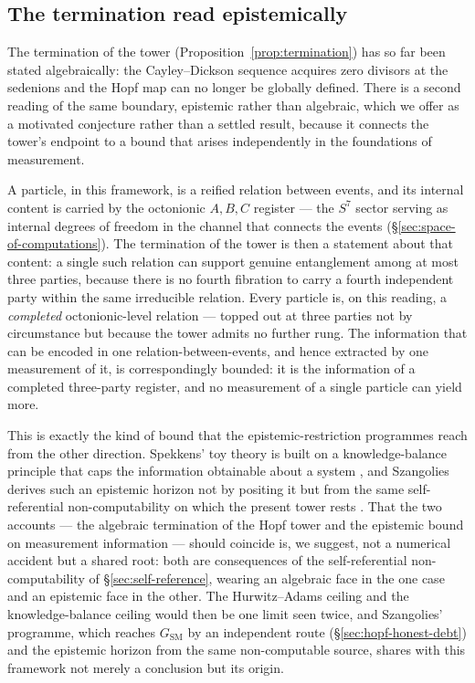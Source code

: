 \subsection{The termination read epistemically}
\label{sec:hopf-information-bound}

The termination of the tower (Proposition~\ref{prop:termination}) has so far been stated
algebraically: the Cayley--Dickson sequence acquires zero divisors at the sedenions and the Hopf
map can no longer be globally defined. There is a second reading of the same boundary, epistemic
rather than algebraic, which we offer as a motivated conjecture rather than a settled result,
because it connects the tower's endpoint to a bound that arises independently in the foundations
of measurement.

A particle, in this framework, is a reified relation between events, and its internal content is
carried by the octonionic $A,B,C$ register --- the $S^{7}$ sector serving as internal degrees of
freedom in the channel that connects the events (\S\ref{sec:space-of-computations}). The
termination of the tower is then a statement about that content: a single such relation can
support genuine entanglement among at most three parties, because there is no fourth fibration
to carry a fourth independent party within the same irreducible relation. Every particle is, on
this reading, a \emph{completed} octonionic-level relation --- topped out at three parties not
by circumstance but because the tower admits no further rung. The information that can be
encoded in one relation-between-events, and hence extracted by one measurement of it, is
correspondingly bounded: it is the information of a completed three-party register, and no
measurement of a single particle can yield more.

This is exactly the kind of bound that the epistemic-restriction programmes reach from the other
direction. Spekkens' toy theory is built on a knowledge-balance principle that caps the
information obtainable about a system \autocite{spekkens2007toy}, and Szangolies derives such an
epistemic horizon not by positing it but from the same self-referential non-computability on
which the present tower rests \autocite{szangolies_j_2018}. That the two accounts --- the
algebraic termination of the Hopf tower and the epistemic bound on measurement information ---
should coincide is, we suggest, not a numerical accident but a shared root: both are
consequences of the self-referential non-computability of \S\ref{sec:self-reference}, wearing an
algebraic face in the one case and an epistemic face in the other. The Hurwitz--Adams ceiling
and the knowledge-balance ceiling would then be one limit seen twice, and Szangolies' programme,
which reaches $G_{\mathrm{SM}}$ by an independent route (\S\ref{sec:hopf-honest-debt}) and the
epistemic horizon from the same non-computable source, shares with this framework not merely a
conclusion but its origin.

